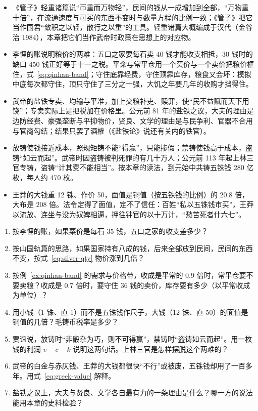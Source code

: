 \begin{takeaways}
\begin{itemize}
\item 《管子》轻重诸篇说“币重而万物轻”，民间的钱从一成增加到全部，“万物重十倍”，在流通速度与可买的东西不变时与数量方程的比例一致；《管子》把它当作国君“敛积之以轻，散行之以重”的工具。轻重诸篇大概编成于汉代（金谷治 1984），本章把它们当作武帝时政策在思想上的对应物。
\item 李悝的账说明粮价的两难：五口之家要每石卖 40 钱才能收支相抵，30 钱时的缺口 450 钱正好等于十一之税。平籴与常平仓用一个买价与一个卖价把粮价框住，式~\eqref{eq:qinhan-band}；守住底靠经费，守住顶靠库存，粮食又会坏：模拟中底每次都守住，顶只守住了三分之一强，大饥之年要几年的收购才挡得住。
\item 武帝的盐铁专卖、均输与平准，加上交粮补吏、赎罪，使“民不益赋而天下用饶”；专卖实际上是把税加在价格里。公元前 81 年的盐铁之议，大夫的理由是边防经费、豪强垄断与平抑物价，贤良、文学的理由是与民争利、官器不合用与官商勾结；结果只罢了酒榷（《盐铁论》说还有关内的铁官）。
\item 放铸使钱接近成本，照规矩铸不能“得赢”，只能掺假；禁铸使钱高于成本，盗铸“如云而起”。武帝时因盗铸被判死罪的有几十万人；公元前 113 年起上林三官专铸，盗铸“计其费不能相当”。按本章的读法，到元始中共铸五铢钱 280 亿枚，每人约 470 枚。
\item 王莽的大钱重 12 铢、作价 50，面值是铜值（按五铢钱的比例）的 20.8 倍，大布是 208 倍。法令定得了面值，定不了信任：百姓“私以五铢钱市买”，王莽以流放、连坐与没为奴婢相逼，押往钟官的以十万计，“愁苦死者什六七”。
\end{itemize}
\end{takeaways}

\begin{selfcheck}
\begin{enumerate}
\item 按李悝的账，如果粟价是每石 35 钱，五口之家的收支差多少？
\item 按山国轨篇的思路，如果国家持有八成的钱，后来全部放到民间，民间的东西不变，按式~\eqref{eq:silver-qty} 物价涨到几倍？
\item 按例~\ref{ex:qinhan-band} 的需求与价格带，收成是平常的 0.9 倍时，常平仓要不要卖粮？收成是 0.7 倍时，要守住 36 钱的卖价，库存要有多少（以平常收成为单位）？
\item 用小钱（1 铢、直 1）而不是五铢钱作尺子，大钱（12 铢、直 50）的面值是铜值的几倍？毛铸币税率是多少？
\item 贾谊说，放铸时“非殽杂为巧，则不可得赢”，禁铸时“盗铸如云而起”。用一枚钱的利润 $v-c-k$ 说明这两句话。上林三官是怎样摆脱这个两难的？
\item 武帝的白金与赤仄钱、王莽的大钱都很快“不行”或被废，五铢钱却用了一百多年。用式~\eqref{eq:greek-value} 解释。
\item 盐铁之议上，大夫与贤良、文学各自最有力的一条理由是什么？哪一方的说法能用本章的史料检验？
\end{enumerate}
\end{selfcheck}

